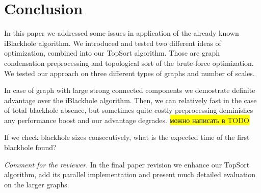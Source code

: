 \documentclass{svproc}
\newcommand{\FIXME}[1]{ %
	\colorbox{yellow}{#1}
}
\newcommand{\FIXME}[1]{ %
}
\begin{document}
\section{Conclusion}

In this paper we addressed some issues in application of the already known iBlackhole algorithm. We introduced and tested two different ideas of optimization, combined into
our TopSort algorithm. Those are graph condensation preprocessing and topological sort of the brute-force optimization. We tested our approach on three different types of graphs and number of scales.

In case of graph with large strong connected components we demostrate definite advantage over the iBlackhole algorithm. Then, we can relatively fast in the case of total blackhole absence, but sometimes quite costly preprocessing
deminishes any performance boost and our advantage  degrades.
\FIXME{можно написать в TODO}
If we check blackhole sizes consecutively, what is the expected time of the first blackhole found? 

\textit{Comment for the reviewer}. In the final paper revision we enhance our TopSort algorithm, add its parallel implementation and present much detailed evaluation on the larger graphs. 

%
%


\end{document}

